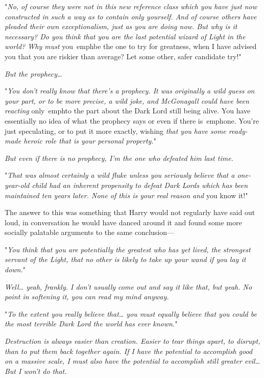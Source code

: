 "\emph{No, of course they were not in this new reference class which you have 
just now constructed in such a way as to contain only yourself. And of course 
others have pleaded their own exceptionalism, just as you are doing now. But 
why is it necessary? Do you think that you are the last potential wizard of 
Light in the world? Why must} you\ emph{be the one to try for greatness, when I 
have advised you that you are riskier than average? Let some other, safer 
candidate try!}"

\emph{But the prophecy{\ldots}}

"\emph{You don't really know that there's a prophecy. It was originally a wild 
guess on your part, or to be more precise, a wild joke, and McGonagall could 
have been reacting} only\ emph{to the part about the Dark Lord still being 
alive. You have essentially no idea of what the prophecy says or even if there} 
is\ emph{one. You're just speculating, or to put it more exactly,} wishing 
\emph{that you have some ready-made heroic role that is your personal 
property.}"

\emph{But even if there is no prophecy, I'm the one who defeated him last time.}

"\emph{That was almost certainly a wild fluke unless you seriously believe that 
a one-year-old child had an inherent propensity to defeat Dark Lords which has 
been maintained ten years later. None of this is your real reason and} you know 
it!"

The answer to this was something that Harry would not regularly have said out 
loud, in conversation he would have danced around it and found some more 
socially palatable arguments to the same conclusion---

"\emph{You think that you are potentially the greatest who has yet lived, the 
strongest servant of the Light, that no other is likely to take up your wand if 
you lay it down.}"

\emph{Well{\ldots} yeah, frankly. I don't usually come out and say it like 
that, but yeah. No point in softening it, you can read my mind anyway.}

"\emph{To the extent you really believe that{\ldots} you must equally believe 
that you could be the most terrible Dark Lord the world has ever known.}"

\emph{Destruction is always easier than creation. Easier to tear things apart, 
to disrupt, than to put them back together again. If I have the potential to 
accomplish good on a massive scale, I must also have the potential to 
accomplish still greater evil{\ldots} But I won't do that.}

